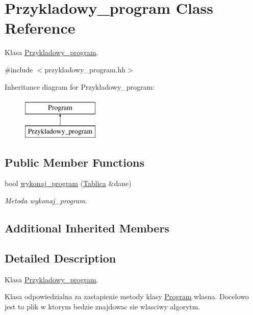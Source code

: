 \hypertarget{class_przykladowy__program}{\section{Przykladowy\-\_\-program Class Reference}
\label{class_przykladowy__program}
}


Klasa \hyperlink{class_przykladowy__program}{Przykladowy\-\_\-program}.  




{\ttfamily \#include $<$przykladowy\-\_\-program.\-hh$>$}

Inheritance diagram for Przykladowy\-\_\-program\-:\begin{figure}[H]
\begin{center}
\leavevmode
\includegraphics[height=2.000000cm]{class_przykladowy__program}
\end{center}
\end{figure}
\subsection*{Public Member Functions}
\begin{DoxyCompactItemize}
\item 
bool \hyperlink{class_przykladowy__program_a4215d5b5562be2a26f601dec4d4f6501}{wykonaj\-\_\-program} (\hyperlink{class_tablica}{Tablica} \&dane)
\begin{DoxyCompactList}\small\item\em Metoda wykonaj\-\_\-program. \end{DoxyCompactList}\end{DoxyCompactItemize}
\subsection*{Additional Inherited Members}


\subsection{Detailed Description}
Klasa \hyperlink{class_przykladowy__program}{Przykladowy\-\_\-program}. 

Klasa odpowiedzialna za zastapienie metody klasy \hyperlink{class_program}{Program} wlasna. Docelowo jest to plik w ktorym bedzie znajdowac sie wlasciwy algorytm. 

